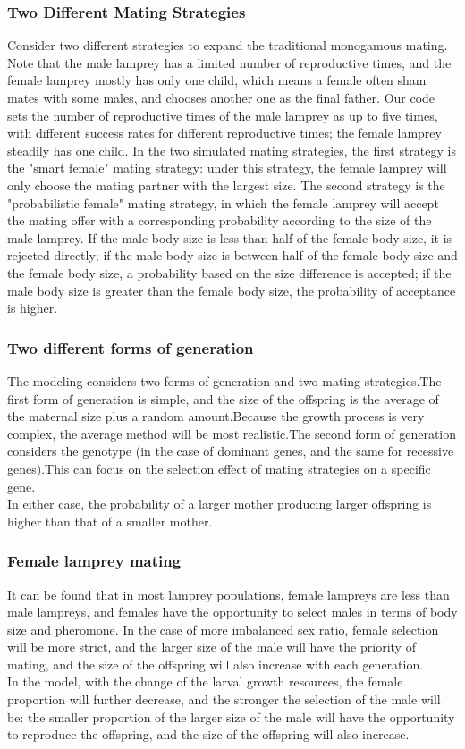 \documentclass[12pt]{article}
\begin{document}
\subsubsection{Two Different Mating Strategies}
Consider two different strategies to expand the traditional monogamous mating. Note that the 
male lamprey has a limited number of reproductive times, and the female lamprey mostly has 
only one child, which means a female often sham mates with some males, and chooses another 
one as the final father. Our code sets the number of reproductive times of the male lamprey 
as up to five times, with different success rates for different reproductive times; the female 
lamprey steadily has one child. In the two simulated mating strategies, the first strategy is 
the "smart female" mating strategy: under this strategy, the female lamprey will only choose 
the mating partner with the largest size. The second strategy is the "probabilistic female" 
mating strategy, in which the female lamprey will accept the mating offer with a corresponding 
probability according to the size of the male lamprey. If the male body size is less than 
half of the female body size, it is rejected directly; if the male body size is between half 
of the female body size and the female body size, a probability based on the size difference 
is accepted; if the male body size is greater than the female body size, the probability of acceptance is higher. 
\subsubsection{Two different forms of generation}
The modeling considers two forms of generation and two mating strategies.The first form of 
generation is simple, and the size of the offspring is the average of the maternal size 
plus a random amount.Because the growth process is very complex, the average method will 
be most realistic.The second form of generation considers the genotype (in the case of 
dominant genes, and the same for recessive genes).This can focus on the selection effect 
of mating strategies on a specific gene. \\
In either case, the probability of a larger mother producing larger offspring is higher 
than that of a smaller mother. 
\subsubsection{Female lamprey mating}
It can be found that in most lamprey populations, female lampreys are less than male lampreys, 
and females have the opportunity to select males in terms of body size and pheromone. In the 
case of more imbalanced sex ratio, female selection will be more strict, and the larger 
size of the male will have the priority of mating, and the size of the offspring will 
also increase with each generation. \\
In the model, with the change of the larval growth resources, the female proportion will 
further decrease, and the stronger the selection of the male will be: the smaller proportion 
of the larger size of the male will have the opportunity to reproduce the offspring, and the 
size of the offspring will also increase. 
\end{document}
